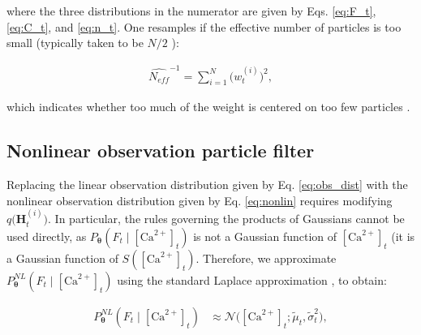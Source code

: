 \documentclass[10pt]{article}
\providecommand{\ve}[1]{\boldsymbol{#1}}
\providecommand{\ve}[1]{\boldsymbol{#1}}
\newcommand{\thetn}{\ve{\theta}}
\newcommand{\p}{P_{\thetn}}
\newcommand{\Ca}{[\text{Ca}^{2+}]}
\begin{document}
%
%
\noindent where the three distributions in the numerator are given by Eqs. \ref{eq:F_t}, \ref{eq:C_t}, and \ref{eq:n_t}.	One resamples if the effective number of particles is too small (typically taken to be $N/2$ \cite{DoucetGordon01}): 

\begin{align} \label{eq:N_eff}
\widehat{N_{eff}}^{-1} = \sum_{i=1}^N \big(w_t^{(i)}\big)^2,
\end{align}

\noindent which indicates whether too much of the weight is centered on too few particles \cite{DoucetGordon01}.%

\subsection{Nonlinear observation particle filter} \label{sec:NOOPSI}

Replacing the linear observation distribution given by Eq. \ref{eq:obs_dist} with the nonlinear observation distribution given by Eq. \ref{eq:nonlin} requires modifying  $q\big(\ve{H}_t^{(i)})$.  In particular, the rules governing the products of Gaussians cannot be used directly, as \mbox{$\p(F_t \mid \Ca_t)$} is not a Gaussian function of $\Ca_t$ (it is a Gaussian function of $S(\Ca_t)$.  Therefore, we approximate $\p^{NL}(F_t \mid \Ca_t)$ using the standard Laplace approximation \cite{KassRaftery95}, to obtain:

\begin{align} \label{eq:LA}
\p^{NL}(F_t \mid \Ca_t) &\approx \mathcal{N}\big(\Ca_t; \widetilde{\mu}_t, \widetilde{\sigma}_t^2\big),
\end{align}
\end{document}
